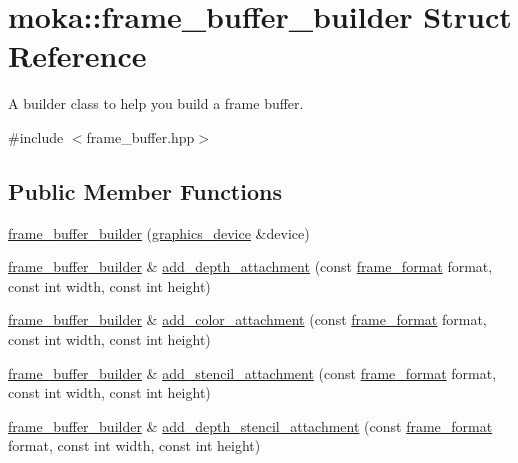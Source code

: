 \hypertarget{structmoka_1_1frame__buffer__builder}{}\section{moka\+::frame\+\_\+buffer\+\_\+builder Struct Reference}
\label{structmoka_1_1frame__buffer__builder}


A builder class to help you build a frame buffer.  




{\ttfamily \#include $<$frame\+\_\+buffer.\+hpp$>$}

\subsection*{Public Member Functions}
\begin{DoxyCompactItemize}
\item 
\mbox{\hyperlink{structmoka_1_1frame__buffer__builder_ae89d036ae7b2e0b0961069ae320b9657}{frame\+\_\+buffer\+\_\+builder}} (\mbox{\hyperlink{classmoka_1_1graphics__device}{graphics\+\_\+device}} \&device)
\item 
\mbox{\hyperlink{structmoka_1_1frame__buffer__builder}{frame\+\_\+buffer\+\_\+builder}} \& \mbox{\hyperlink{structmoka_1_1frame__buffer__builder_a8388e76906c370d12ada49ddd74d01f2}{add\+\_\+depth\+\_\+attachment}} (const \mbox{\hyperlink{namespacemoka_a2ce6b5e22cd8e423713ef76033a279de}{frame\+\_\+format}} format, const int width, const int height)
\item 
\mbox{\hyperlink{structmoka_1_1frame__buffer__builder}{frame\+\_\+buffer\+\_\+builder}} \& \mbox{\hyperlink{structmoka_1_1frame__buffer__builder_aecaa9eb51546554c3464fc0efd6d5311}{add\+\_\+color\+\_\+attachment}} (const \mbox{\hyperlink{namespacemoka_a2ce6b5e22cd8e423713ef76033a279de}{frame\+\_\+format}} format, const int width, const int height)
\item 
\mbox{\hyperlink{structmoka_1_1frame__buffer__builder}{frame\+\_\+buffer\+\_\+builder}} \& \mbox{\hyperlink{structmoka_1_1frame__buffer__builder_ad6c11cc2201ea405b915e013fb325c59}{add\+\_\+stencil\+\_\+attachment}} (const \mbox{\hyperlink{namespacemoka_a2ce6b5e22cd8e423713ef76033a279de}{frame\+\_\+format}} format, const int width, const int height)
\item 
\mbox{\hyperlink{structmoka_1_1frame__buffer__builder}{frame\+\_\+buffer\+\_\+builder}} \& \mbox{\hyperlink{structmoka_1_1frame__buffer__builder_ad2e7a423381f7a781a8bb4349caddffb}{add\+\_\+depth\+\_\+stencil\+\_\+attachment}} (const \mbox{\hyperlink{namespacemoka_a2ce6b5e22cd8e423713ef76033a279de}{frame\+\_\+format}} format, const int width, const int height)

\end{DoxyCompactItemize}
